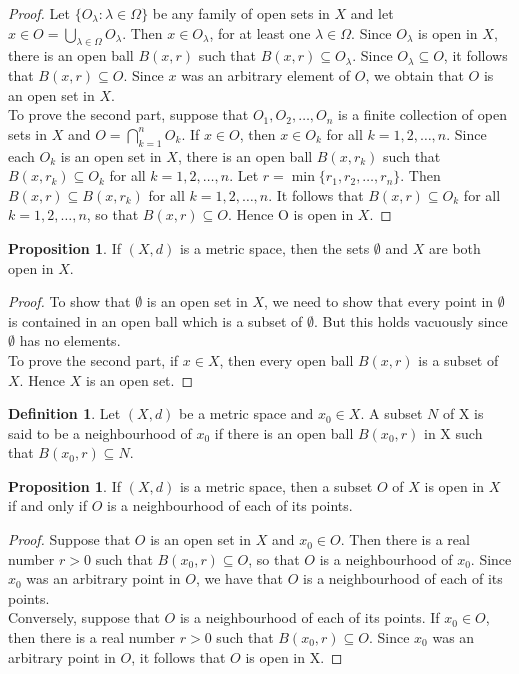 \documentclass[11pt,a4paper]{article}
\theoremstyle{definition}
\newtheorem{defn}[thm]{Definition}
\newtheorem{prop}[thm]{Proposition}
\begin{document}
\begin{proof}
Let $\{O_{\lambda}:\lambda \in \Omega\}$ be any family of open sets in $X$ and let $x\in O=\bigcup_{\lambda \in \Omega} O_{\lambda}$. Then $x\in O_{\lambda}$, for at least one $\lambda \in \Omega$. Since $O_{\lambda}$ is open in $X$, there is an open ball $B(x,r)$ such that $B(x,r)\subseteq O_{\lambda}$. Since $O_{\lambda} \subseteq O$, it follows that $B(x,r)\subseteq O$. Since $x$ was an arbitrary element of $O$, we obtain that $O$ is an open set in $X$.\\
To prove the second part, suppose that $O_1,O_2,\ldots,O_n$ is a finite collection of open sets in $X$ and $O=\bigcap_{k=1}^{n} O_k$. If $x\in O$, then $x\in O_k$ for all $k=1,2,\ldots,n$. Since each $O_k$ is an open set in $X$, there is an open ball $B(x,r_k)$ such that $B(x,r_k)\subseteq O_k$ for all $k=1,2,\ldots,n$. Let $r=\min\{r_1, r_2,\ldots,r_n\}$. Then $B(x,r)\subseteq B(x,r_k)$ for all $k=1,2,\ldots,n$. It follows that $B(x,r)\subseteq O_k$ for all $k=1,2,\ldots,n$, so that $B(x,r)\subseteq O$. Hence O is open in $X$.
\end{proof}




\begin{prop}
If $(X,d)$ is a metric space, then the sets $\emptyset$ and $X$ are both open in $X$.
\end{prop}

\begin{proof}
To show that $\emptyset$ is an open set in $X$, we need to show that every point in $\emptyset$ is contained in an open ball which is a subset of $\emptyset$. But this holds vacuously since $\emptyset$ has no elements.\\ To prove the second part, if $x\in X$, then every open ball $B(x,r)$ is a subset of $X$. Hence $X$ is an open set.
\end{proof}


\begin{defn}
Let $(X,d)$ be a metric space and $x_0\in X$. A subset $N$ of X is said to be a neighbourhood of $x_0$ if there is an open ball $B(x_0,r)$ in X such that $B(x_0,r)\subseteq N$.
\end{defn}


\begin{prop}
If $(X,d)$ is a metric space, then a subset $O$ of $X$ is open in $X$ if and only if $O$ is a neighbourhood of each of its points.
\end{prop}


\begin{proof}
Suppose that $O$ is an open set in $X$ and $x_0\in O$. Then there is a real number $r>0$ such that $B(x_0,r)\subseteq O$, so that $O$ is a neighbourhood of $x_0$. Since $x_0$ was an arbitrary point in $O$, we have that $O$ is a neighbourhood of each of its points.\\ Conversely, suppose that $O$ is a neighbourhood of each of its points. If $x_0\in O$, then there is a real number $r>0$ such that $B(x_0,r)\subseteq O$. Since $x_0$ was an arbitrary point in $O$, it follows that $O$ is open in X.
\end{proof}
\end{document}
